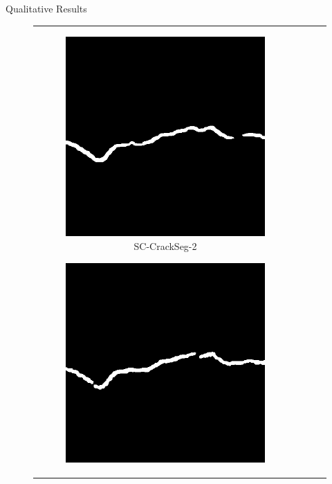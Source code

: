 \documentclass{lib/curtin_format}
\begin{document}
\begin{frame}{Qualitative Results}
\begin{figure}[htbp]
\begin{tabular}{cccc}
\begin{subfigure}[b]{0.23\textwidth}
                \includegraphics[width=\textwidth]{res/crackseg-experiment-qualitative/sc-crackseg-2.png}
                \caption{SC-CrackSeg-2}
                \label{fig:crackseg-experiment-qualitative-sc-crackseg-2}
            \end{subfigure}
            \begin{subfigure}[b]{0.23\textwidth}
                \centering
                \includegraphics[width=\textwidth]{res/crackseg-experiment-qualitative/sc-crackseg-3.png}

\end{subfigure}
\end{tabular}
\end{figure}
\end{frame}
\end{document}
